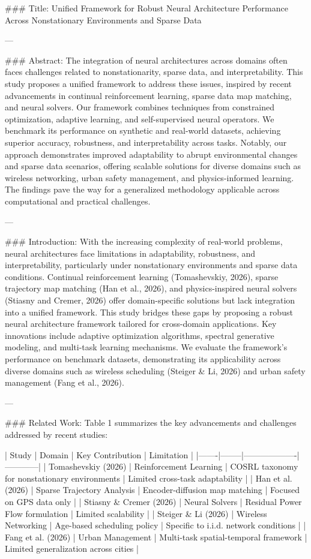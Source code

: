 ### Title:
Unified Framework for Robust Neural Architecture Performance Across Nonstationary Environments and Sparse Data

---

### Abstract:
The integration of neural architectures across domains often faces challenges related to nonstationarity, sparse data, and interpretability. This study proposes a unified framework to address these issues, inspired by recent advancements in continual reinforcement learning, sparse data map matching, and neural solvers. Our framework combines techniques from constrained optimization, adaptive learning, and self-supervised neural operators. We benchmark its performance on synthetic and real-world datasets, achieving superior accuracy, robustness, and interpretability across tasks. Notably, our approach demonstrates improved adaptability to abrupt environmental changes and sparse data scenarios, offering scalable solutions for diverse domains such as wireless networking, urban safety management, and physics-informed learning. The findings pave the way for a generalized methodology applicable across computational and practical challenges.

---

### Introduction:
With the increasing complexity of real-world problems, neural architectures face limitations in adaptability, robustness, and interpretability, particularly under nonstationary environments and sparse data conditions. Continual reinforcement learning (Tomashevskiy, 2026), sparse trajectory map matching (Han et al., 2026), and physics-inspired neural solvers (Stiasny and Cremer, 2026) offer domain-specific solutions but lack integration into a unified framework. This study bridges these gaps by proposing a robust neural architecture framework tailored for cross-domain applications. Key innovations include adaptive optimization algorithms, spectral generative modeling, and multi-task learning mechanisms. We evaluate the framework's performance on benchmark datasets, demonstrating its applicability across diverse domains such as wireless scheduling (Steiger & Li, 2026) and urban safety management (Fang et al., 2026).

---

### Related Work:
Table 1 summarizes the key advancements and challenges addressed by recent studies:

| Study | Domain | Key Contribution | Limitation |
|-------|--------|-------------------|------------|
| Tomashevskiy (2026) | Reinforcement Learning | COSRL taxonomy for nonstationary environments | Limited cross-task adaptability |
| Han et al. (2026) | Sparse Trajectory Analysis | Encoder-diffusion map matching | Focused on GPS data only |
| Stiasny & Cremer (2026) | Neural Solvers | Residual Power Flow formulation | Limited scalability |
| Steiger & Li (2026) | Wireless Networking | Age-based scheduling policy | Specific to i.i.d. network conditions |
| Fang et al. (2026) | Urban Management | Multi-task spatial-temporal framework | Limited generalization across cities |

